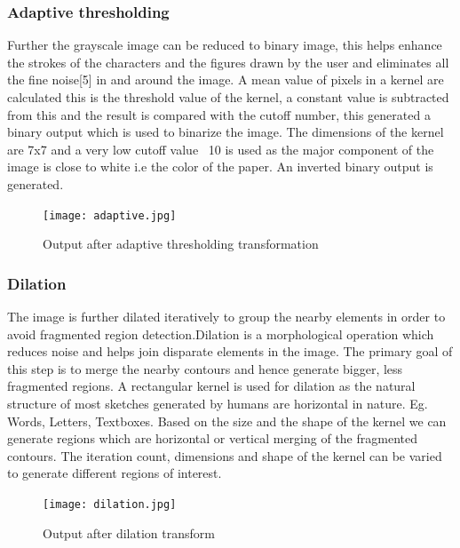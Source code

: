       \subsubsection{Adaptive thresholding}
        Further the grayscale image can be reduced to binary image, this helps enhance the strokes of the characters and the figures drawn by the user and eliminates all the fine noise[5] in and around the image. A mean value of pixels in a kernel are calculated this is the threshold value of the kernel, a constant value is subtracted from this and the result is compared with the cutoff number, this generated a binary output which is used to binarize the image. The dimensions of the kernel are 7x7 and a very low cutoff value ~10 is used as the major component of the image is close to white i.e the color of the paper. An inverted binary output is generated.
        \begin{figure}[H]
      		\centering
      		\texttt{[image: adaptive.jpg]}
      		\caption
      		{Output after adaptive thresholding transformation}
      	\end{figure}

      \subsubsection{Dilation}
        The image is further dilated iteratively to group the nearby elements in order to avoid fragmented region detection.Dilation is a morphological operation which reduces noise and helps join disparate elements in the image. The primary goal of this step is to merge the nearby contours and hence generate bigger, less fragmented regions. A rectangular kernel is used for dilation as the natural structure of most sketches generated by humans are horizontal in nature. Eg. Words, Letters, Textboxes. Based on the size and the shape of the kernel we can generate regions which are horizontal or vertical merging of the fragmented contours. The iteration count, dimensions and shape of the kernel can be varied to generate different regions of interest.
        \begin{figure}[H]
      		\centering
      		\texttt{[image: dilation.jpg]}
      		\caption
      		{Output after dilation transform}
      	\end{figure}

